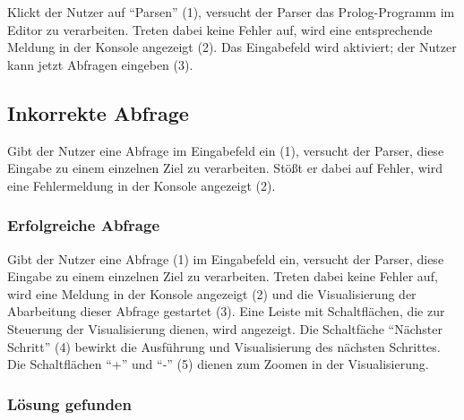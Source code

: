 \documentclass[parskip=full,11pt,twoside]{scrartcl}
\begin{document}
Klickt der Nutzer auf \enquote{Parsen} (1), versucht der Parser das Prolog-Programm im Editor zu verarbeiten.
Treten dabei keine Fehler auf, wird eine entsprechende Meldung in der Konsole angezeigt (2).
Das Eingabefeld wird aktiviert; der Nutzer kann jetzt Abfragen eingeben (3).

\subsection{Inkorrekte Abfrage}

\begin{minipage}{\linewidth}
\end{minipage}

Gibt der Nutzer eine Abfrage im Eingabefeld ein (1), versucht der Parser, diese Eingabe zu einem einzelnen Ziel zu verarbeiten.
Stößt er dabei auf Fehler, wird eine Fehlermeldung in der Konsole angezeigt (2).

\subsubsection{Erfolgreiche Abfrage}

\begin{minipage}{\linewidth}
\end{minipage}

Gibt der Nutzer eine Abfrage (1) im Eingabefeld ein, versucht der Parser, diese Eingabe zu einem einzelnen Ziel zu verarbeiten.
Treten dabei keine Fehler auf, wird eine Meldung in der Konsole angezeigt (2) und die Visualisierung der Abarbeitung dieser Abfrage gestartet (3).
Eine Leiste mit Schaltflächen, die zur Steuerung der Visualisierung dienen, wird angezeigt.
Die Schaltfäche \enquote{Nächster Schritt} (4) bewirkt die Ausführung und Visualisierung des nächsten Schrittes.
Die Schaltflächen \enquote{+} und \enquote{-} (5) dienen zum Zoomen in der Visualisierung.

\subsubsection{Lösung gefunden}

\begin{minipage}{\linewidth}
\end{minipage}
\end{document}
